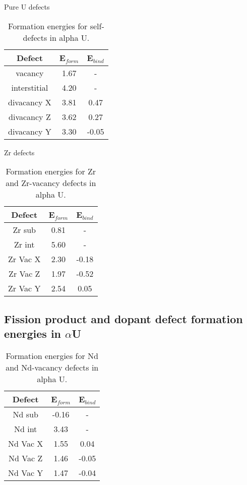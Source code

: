 \documentclass[review]{elsarticle}
\begin{document}
Pure U defects

\begin{table}[h!]
\caption{Formation energies for self-defects in alpha U.}
\label{tab:Eforms}
\begin{center}
\begin{tabular}{|c|c|c|}
     \hline
      Defect & E$_{form}$ & E$_{bind}$ \\
     \hline
     vacancy & 1.67 & - \\
     interstitial & 4.20 & - \\
     divacancy X & 3.81 & 0.47 \\
     divacancy Z & 3.62 & 0.27 \\
     divacancy Y & 3.30 & -0.05 \\
       \hline
\end{tabular}
\end{center}
\label{default}
\end{table}%

Zr defects

\begin{table}[h!]
\caption{Formation energies for Zr and Zr-vacancy defects in alpha U.}
\label{tab:Eforms}
\begin{center}
\begin{tabular}{|c|c|c|}
     \hline
      Defect & E$_{form}$ & E$_{bind}$ \\
     \hline
     Zr sub & 0.81 & - \\
     Zr int & 5.60 & - \\
     Zr Vac X & 2.30 & -0.18 \\
     Zr Vac Z & 1.97 & -0.52 \\
     Zr Vac Y & 2.54 & 0.05 \\
       \hline
\end{tabular}
\end{center}
\label{default}
\end{table}%

\subsection{Fission product and dopant defect formation energies in $\alpha$U}

\begin{table}[h!]
\caption{Formation energies for Nd and Nd-vacancy defects in alpha U.}
\label{tab:Eforms}
\begin{center}
\begin{tabular}{|c|c|c|}
     \hline
      Defect & E$_{form}$ & E$_{bind}$ \\
     \hline
     Nd sub & -0.16 & - \\
     Nd int & 3.43 & - \\
     Nd Vac X & 1.55 & 0.04 \\
     Nd Vac Z & 1.46 & -0.05 \\
     Nd Vac Y & 1.47 & -0.04 \\
       \hline
\end{tabular}
\end{center}
\label{default}
\end{table}%
\end{document}
